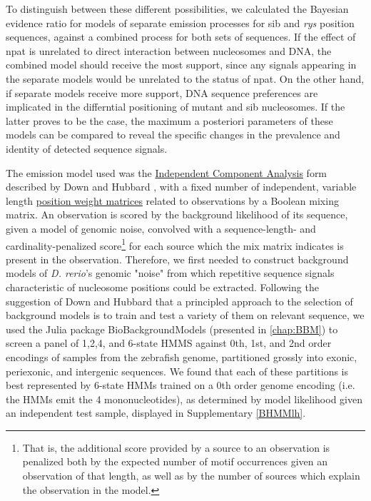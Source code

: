 To distinguish between these different possibilities, we calculated the Bayesian evidence ratio for models of separate emission processes for sib and \textit{rys} position sequences, against a combined process for both sets of sequences. If the effect of npat is unrelated to direct interaction between nucleosomes and DNA, the combined model should receive the most support, since any signals appearing in the separate models would be unrelated to the status of npat. On the other hand, if separate models receive more support, DNA sequence preferences are implicated in the differntial positioning of mutant and sib nucleosomes. If the latter proves to be the case, the maximum a posteriori parameters of these models can be compared to reveal the specific changes in the prevalence and identity of detected sequence signals.

The emission model used was the \hyperref[ssec:ICA]{Independent Component Analysis} form described by Down and Hubbard \cite{Down2005}, with a fixed number of independent, variable length \hyperref[ssec:PWM]{position weight matrices} related to observations by a Boolean mixing matrix. An observation is scored by the background likelihood of its sequence, given a model of genomic noise, convolved with a sequence-length- and cardinality-penalized score\footnote{That is, the additional score provided by a source to an observation is penalized both by the expected number of motif occurrences given an observation of that length, as well as by the number of sources which explain the observation in the model.} for each source which the mix matrix indicates is present in the observation. Therefore, we first needed to construct background models of \textit{D. rerio}'s genomic "noise" from which repetitive sequence signals characteristic of nucleosome positions could be extracted. Following the suggestion of Down and Hubbard \cite{Down2005} that a principled approach to the selection of background models is to train and test a variety of them on relevant sequence, we used the Julia package BioBackgroundModels (presented in \autoref{chap:BBM}) to screen a panel of 1,2,4, and 6-state HMMS against  0th, 1st, and 2nd order encodings of samples from the zebrafish genome, partitioned grossly into exonic, periexonic, and intergenic sequences. We found that each of these partitions is best represented by 6-state HMMs trained on a 0th order genome encoding (i.e. the HMMs emit the 4 mononucleotides), as determined by model likelihood given an independent test sample, displayed in Supplementary \autoref{BHMMlh}.

